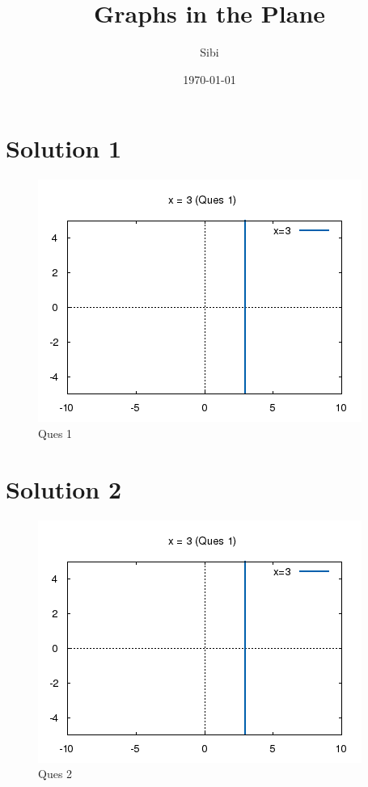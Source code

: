 \documentclass{article}
\begin{document}
\title{Graphs in the Plane}
\author{Sibi}
\date{\today}
\maketitle

\DeclarePairedDelimiter\abs{\lvert}{\rvert}%
\DeclarePairedDelimiter\norm{\lVert}{\rVert}%

\makeatletter
\let\oldabs\abs
\def\abs{\@ifstar{\oldabs}{\oldabs*}}
% 
\let\oldnorm\norm
\def\norm{\@ifstar{\oldnorm}{\oldnorm*}}
\makeatother
\newpage

\section{Solution 1}

\begin{figure}[!htb]
\centering
\includegraphics{./plots/one.png}
\caption{Ques 1}
\end{figure}

\section {Solution 2}

\begin{figure}[!htb]
\centering
\includegraphics{./plots/one.png}
\caption{Ques 2}
\end{figure}
\end{document}
